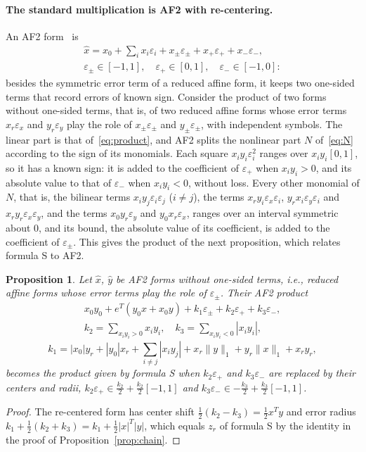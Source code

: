 \documentclass[10pt]{article}
\newtheorem{propo}{Proposition}
\theoremstyle{definition}
\newcommand{\eps}{\varepsilon}
\newcommand{\ex}{\eps_x}
\newcommand{\ey}{\eps_y}
\begin{document}
\paragraph{The standard multiplication is AF2 with re-centering.} An AF2 form~\cite{messine2002extentions} is
\[
\begin{gathered}\hat x = x_0+\sum_i x_i\eps_i + x_\pm\eps_\pm + x_+\eps_+ + x_-\eps_-,\\ \eps_\pm\in[-1,1],\quad \eps_+\in[0,1],\quad \eps_-\in[-1,0]:\end{gathered}
\]
besides the symmetric error term of a reduced affine form, it keeps two one-sided terms that record errors of known sign. Consider the product of two forms without one-sided terms, that is, of two reduced affine forms whose error terms $x_r\ex$ and $y_r\ey$ play the role of $x_\pm\eps_\pm$ and $y_\pm\eps_\pm$, with independent symbols. The linear part is that of~\eqref{eq:product}, and AF2 splits the nonlinear part $N$ of~\eqref{eq:N} according to the sign of its monomials. Each square $x_iy_i\eps_i^2$ ranges over $x_iy_i[0,1]$, so it has a known sign: it is added to the coefficient of $\eps_+$ when $x_iy_i>0$, and its absolute value to that of $\eps_-$ when $x_iy_i<0$, without loss. Every other monomial of $N$, that is, the bilinear terms $x_iy_j\eps_i\eps_j$ ($i\ne j$), the terms $x_ry_i\ex\eps_i$, $y_rx_i\ey\eps_i$ and $x_ry_r\ex\ey$, and the terms $x_0y_r\ey$ and $y_0x_r\ex$, ranges over an interval symmetric about $0$, and its bound, the absolute value of its coefficient, is added to the coefficient of $\eps_\pm$. This gives the product of the next proposition, which relates formula S to AF2.

\begin{propo}
\label{prop:af2}
Let $\hat x$, $\hat y$ be AF2 forms without one-sided terms, i.e., reduced affine forms whose error terms play the role of $\eps_\pm$. Their AF2 product~\cite{messine2002extentions}
\[
\begin{gathered}x_0y_0 + e^T(y_0x+x_0y) + k_1\eps_\pm + k_2\eps_+ + k_3\eps_-,\\ k_2=\sum_{x_iy_i>0}x_iy_i,\quad k_3=\sum_{x_iy_i<0}|x_iy_i|,\end{gathered}
\]
\[
k_1 = |x_0|y_r+|y_0|x_r+\sum_{i\ne j}|x_iy_j| + x_r\|y\|_1+y_r\|x\|_1+x_ry_r,
\]
becomes the product given by formula S when $k_2\eps_+$ and $k_3\eps_-$ are replaced by their centers and radii, $k_2\eps_+\in \tfrac{k_2}{2}+\tfrac{k_2}{2}[-1,1]$ and $k_3\eps_-\in-\tfrac{k_3}{2}+\tfrac{k_3}{2}[-1,1]$.
\end{propo}
\begin{proof}
The re-centered form has center shift $\tfrac12(k_2-k_3)=\tfrac12x^Ty$ and error radius $k_1+\tfrac12(k_2+k_3) = k_1+\tfrac12|x|^T|y|$, which equals $z_r$ of formula S by the identity in the proof of Proposition~\ref{prop:chain}.
\end{proof}
\end{document}
